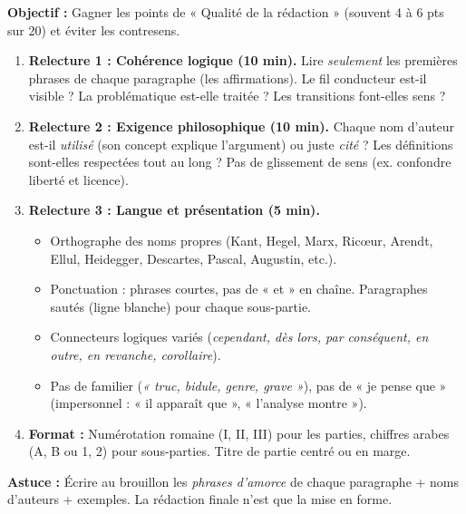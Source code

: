 \documentclass[11pt]{article}
\begin{document}
\begin{methode}
\textbf{Objectif :} Gagner les points de « Qualité de la rédaction » (souvent 4 à 6 pts sur 20) et éviter les contresens.
\begin{enumerate}
    \item \textbf{Relecture 1 : Cohérence logique (10 min).} Lire \emph{seulement} les premières phrases de chaque paragraphe (les affirmations). Le fil conducteur est-il visible ? La problématique est-elle traitée ? Les transitions font-elles sens ?
    \item \textbf{Relecture 2 : Exigence philosophique (10 min).} Chaque nom d'auteur est-il \emph{utilisé} (son concept explique l'argument) ou juste \emph{cité} ? Les définitions sont-elles respectées tout au long ? Pas de glissement de sens (ex. confondre liberté et licence).
    \item \textbf{Relecture 3 : Langue et présentation (5 min).}
        \begin{itemize}
            \item Orthographe des noms propres (Kant, Hegel, Marx, Ricœur, Arendt, Ellul, Heidegger, Descartes, Pascal, Augustin, etc.).
            \item Ponctuation : phrases courtes, pas de « et » en chaîne. Paragraphes sautés (ligne blanche) pour chaque sous-partie.
            \item Connecteurs logiques variés (\emph{cependant, dès lors, par conséquent, en outre, en revanche, corollaire}).
            \item Pas de familier (\emph{« truc, bidule, genre, grave »}), pas de « je pense que » (impersonnel : « il apparaît que », « l'analyse montre »).
        \end{itemize}
    \item \textbf{Format :} Numérotation romaine (I, II, III) pour les parties, chiffres arabes (A, B ou 1, 2) pour sous-parties. Titre de partie centré ou en marge.
\end{enumerate}
\textbf{Astuce :} Écrire au brouillon les \emph{phrases d'amorce} de chaque paragraphe + noms d'auteurs + exemples. La rédaction finale n'est que la mise en forme.
\end{methode}
\end{document}
